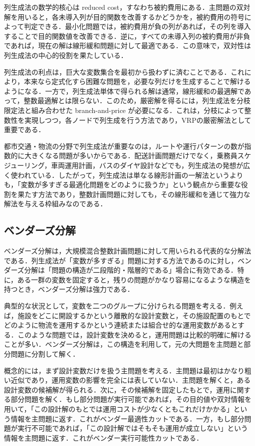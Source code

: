 列生成法の数学的核心は reduced cost，すなわち被約費用にある．主問題の双対解を用いると，各未導入列が目的関数を改善するかどうかを，被約費用の符号によって判定できる．最小化問題では，被約費用が負の列があれば，その列を導入することで目的関数値を改善できる．逆に，すべての未導入列の被約費用が非負であれば，現在の解は線形緩和問題に対して最適である．この意味で，双対性は列生成法の中心的役割を果たしている．

列生成法の利点は，巨大な変数集合を最初から扱わずに済むことである．これにより，本来なら定式化すら困難な問題を，必要な列だけを生成することで解けるようになる．一方で，列生成法単体で得られる解は通常，線形緩和の最適解であって，整数最適解とは限らない．このため，厳密解を得るには，列生成法を分枝限定法と組み合わせた branch-and-price が必要になる．これは，分枝によって整数性を実現しつつ，各ノードで列生成を行う方法であり，VRPの厳密解法として重要である．

都市交通・物流の分野で列生成法が重要なのは，ルートや運行パターンの数が指数的に大きくなる問題が多いからである．配送計画問題だけでなく，乗務員スケジューリング，車両運用計画，バスのダイヤ設計などでも，列生成法の発想が広く使われている．したがって，列生成法は単なる線形計画の一解法というよりも，「変数が多すぎる最適化問題をどのように扱うか」という観点から重要な役割を果たす方法であり，整数計画問題に対しても，その線形緩和を通じて強力な解法を与える枠組みなのである．

\subsection{ベンダーズ分解}

ベンダーズ分解は，大規模混合整数計画問題に対して用いられる代表的な分解法である\cite{RAHMANIANI2017801}．列生成法が「変数が多すぎる」問題に対する方法であるのに対し，ベンダーズ分解は「問題の構造が二段階的・階層的である」場合に有効である．特に，ある一群の変数を固定すると，残りの問題がかなり容易になるような構造を持つとき，ベンダーズ分解は強力である．

典型的な状況として，変数を二つのグループに分けられる問題を考える．例えば，施設をどこに開設するかという離散的な設計変数と，その施設配置のもとでどのように物流を運用するかという連続または組合せ的な運用変数があるとする．このような問題では，設計変数を決めると，運用問題は比較的明確に解けることが多い．ベンダーズ分解は，この構造を利用して，元の大問題を主問題と部分問題に分割して解く．

概念的には，まず設計変数だけを扱う主問題を考える．主問題は最初はかなり粗い近似であり，運用変数の影響を完全には表していない．主問題を解くと，ある設計変数の候補解が得られる．次に，その候補解を固定したもとで，運用に関する部分問題を解く．もし部分問題が実行可能であれば，その目的値や双対情報を用いて，「この設計解のもとでは運用コストが少なくともこれだけかかる」という情報を主問題に返す．これがベンダー最適性カットである．一方，もし部分問題が実行不可能であれば，「この設計解ではそもそも運用が成立しない」という情報を主問題に返す．これがベンダー実行可能性カットである．

